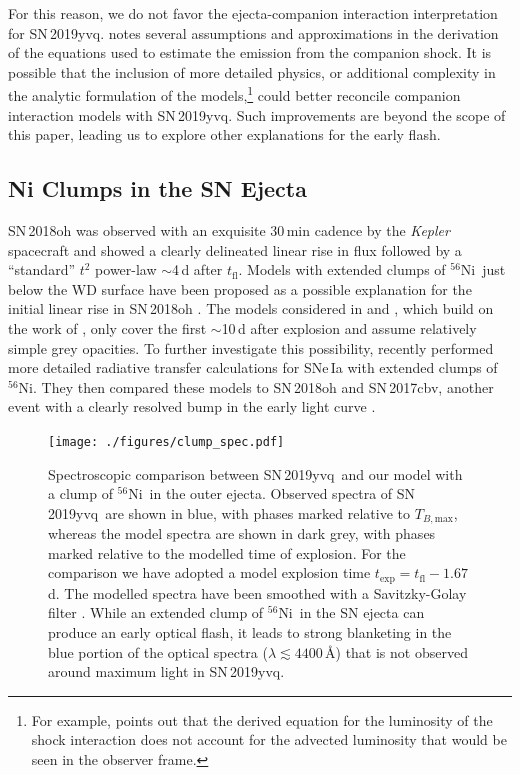 \documentclass[twocolumn]{aastex63}
\newcommand{\tfl}{$t_\mathrm{fl}$}
\newcommand{\tbmax}{$T_{B,\mathrm{max}}$}
\newcommand{\radni}{$^{56}$Ni}
\newcommand{\sn}{SN\,2019yvq}
\begin{document}
For this reason, we do not favor the ejecta-companion interaction
interpretation for \sn. \citet{Kasen10a} notes several assumptions and
approximations in the derivation of the equations used to estimate the
emission from the companion shock. It is possible that the inclusion of more
detailed physics, or additional complexity in the analytic formulation of the
models,\footnote{For example, \citet{Kasen10a} points out that the derived
equation for the luminosity of the shock interaction does not account for the
advected luminosity that would be seen in the observer frame.} could better
reconcile companion interaction models with \sn. Such improvements are beyond
the scope of this paper, leading us to explore other explanations for the
early flash.

\subsection{Ni Clumps in the SN Ejecta}

SN\,2018oh was observed with an exquisite 30\,min cadence by the
\textit{Kepler} spacecraft and showed a clearly delineated linear rise in flux
followed by a ``standard'' $t^2$ power-law $\sim$4\,d after \tfl. Models with
extended clumps of \radni\ just below the WD surface have been proposed as a
possible explanation for the initial linear rise in SN\,2018oh
\citep{Shappee19,Dimitriadis19}. The models considered in \citet{Shappee19}
and \citet{Dimitriadis19}, which build on the work of \citet{Piro16}, only
cover the first $\sim$10\,d after explosion and assume relatively simple grey
opacities. To further investigate this possibility, \citet{Magee20a} recently
performed more detailed radiative transfer calculations for SNe\,Ia with
extended clumps of \radni. They then compared these models to SN\,2018oh and
SN\,2017cbv, another event with a clearly resolved bump in the early light
curve \citep{Hosseinzadeh17}.

\begin{figure}
    \centering
    \texttt{[image: ./figures/clump\_spec.pdf]}
    \caption{Spectroscopic comparison between \sn\ and our model with a clump
    of \radni\ in the outer ejecta. Observed spectra of \sn\ are shown in
    blue, with phases marked relative to \tbmax, whereas the model spectra are
    shown in dark grey, with phases marked relative to the modelled time of
    explosion. For the comparison we have adopted a model explosion time
    $t_\mathrm{exp} = t_\mathrm{fl} - 1.67$\,d. The modelled spectra have been
    smoothed with a Savitzky-Golay filter \citep{Savitzky64}. While an
    extended clump of \radni\ in the SN ejecta can produce an early optical
    flash, it leads to strong blanketing in the blue portion of the optical
    spectra ($\lambda \lesssim 4400$\,\AA) that is not observed around maximum
    light in \sn. }
    \label{fig:Ni_bullet}
\end{figure}
\end{document}
